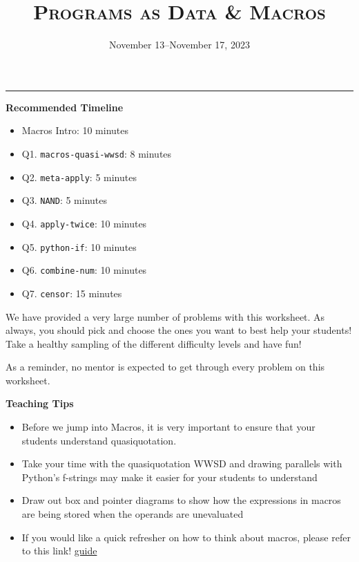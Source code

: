 \documentclass{exam}
\title{\textsc{Programs as Data \& Macros}}
\date{November 13--November 17, 2023}
\begin{document}
\maketitle
\rule{\textwidth}{0.15em}

\begin{meta}
\begin{blocksection}
    \textbf{Recommended Timeline}
    \begin{itemize}
        \item Macros Intro: 10 minutes
        \item Q1. \lstinline{macros-quasi-wwsd}: 8 minutes
        \item Q2. \lstinline{meta-apply}: 5 minutes
        \item Q3. \lstinline{NAND}: 5 minutes
        \item Q4. \lstinline{apply-twice}: 10 minutes
        \item Q5. \lstinline{python-if}: 10 minutes
        \item Q6. \lstinline{combine-num}: 10 minutes
        \item Q7. \lstinline{censor}: 15 minutes 
    \end{itemize}
\end{blocksection}
\vspace{5mm}

We have provided a very large number of problems with this worksheet. As always, you should pick and choose the ones you want to best help your students! Take a healthy sampling of the different difficulty levels and have fun!

As a reminder, no mentor is expected to get through every problem on this worksheet.

\end{meta}

\vspace{3mm}

\begin{meta}
\textbf{Teaching Tips}
\begin{itemize}
    \item Before we jump into Macros, it is very important to ensure that your students understand quasiquotation.
    \item Take your time with the quasiquotation WWSD and drawing parallels with Python's f-strings may make it easier for your students to understand 
    \item Draw out box and pointer diagrams to show how the expressions in macros are being stored when the operands are unevaluated
    \item If you would like a quick refresher on how to think about macros, please refer to this link! \href{https://docs.google.com/document/d/1JSbvtJ5bYUEhovDZd_gQnBvkG_WDcafmX-4B3QeIXZU/edit}{guide}
\end{itemize}
\end{meta}
\end{document}
